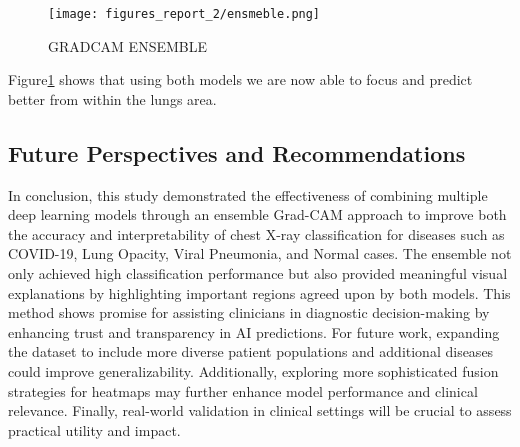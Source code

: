 \documentclass{article}
\begin{document}
\begin{figure}[ht] %
    \centering
    \texttt{[image: figures\_report\_2/ensmeble.png]}
    \caption{GRADCAM ENSEMBLE}
    \label{figures_report_2/ensmeble.png}
\end{figure}

Figure\ref{figures_report_2/ensmeble.png} shows that using both models we are now able to focus and predict better from within the lungs area.


\subsection*{Future Perspectives and Recommendations}

In conclusion, this study demonstrated the effectiveness of combining multiple deep learning models through an ensemble Grad-CAM approach to improve both the accuracy and interpretability of chest X-ray classification for diseases such as COVID-19, Lung Opacity, Viral Pneumonia, and Normal cases. The ensemble not only achieved high classification performance but also provided meaningful visual explanations by highlighting important regions agreed upon by both models. This method shows promise for assisting clinicians in diagnostic decision-making by enhancing trust and transparency in AI predictions. For future work, expanding the dataset to include more diverse patient populations and additional diseases could improve generalizability. Additionally, exploring more sophisticated fusion strategies for heatmaps may further enhance model performance and clinical relevance. Finally, real-world validation in clinical settings will be crucial to assess practical utility and impact.
\end{document}
